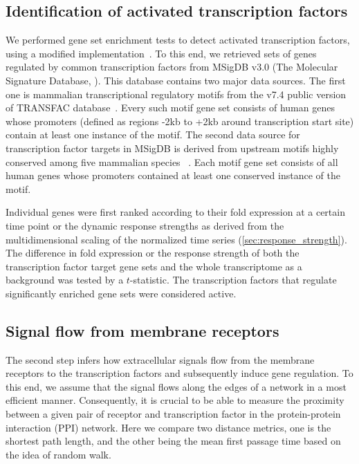 \subsection{Identification of activated transcription factors}
We performed gene set enrichment tests to detect activated
transcription factors, 
using a modified implementation~\citep{Luo2009}.
To this end, we retrieved sets of genes regulated by 
common transcription factors from MSigDB v3.0 (The Molecular Signature Database, \cite{Liberzon2011}). 
This database contains two major data sources. The first one is mammalian 
transcriptional regulatory motifs from the v7.4 public version of TRANSFAC 
database~\citep{Matys2003b}. Every such motif gene set consists of human 
genes whose promoters (defined as regions -2kb to +2kb around transcription 
start site) contain at least one instance of the motif.
The second data source for transcription factor targets in MSigDB is derived 
from upstream motifs highly conserved among five mammalian species~%
\citep{Xie2005e}. Each motif gene set consists of all human genes whose 
promoters contained at least one conserved instance of the motif.

Individual genes were first ranked according to their fold 
expression at a certain time point or the dynamic response 
strengths as derived from the 
multidimensional scaling of the normalized time series 
(\ref{sec:response_strength}). The difference in fold 
expression or the response strength of both
the transcription factor target gene sets and  
the whole transcriptome as a background was tested by a 
$t$-statistic. 
The transcription factors that regulate 
significantly enriched
gene sets were considered active.

\subsection{Signal flow from membrane receptors}
The second step infers how extracellular signals flow from the 
membrane receptors to 
the transcription factors and subsequently induce gene regulation. 
To this end, we assume that the signal flows along the edges of a network 
in a most efficient manner. Consequently, it is 
crucial to be able to measure the proximity between a given pair of receptor and
transcription factor in the protein-protein interaction (PPI) 
network. Here we 
compare two distance metrics, one is the shortest path length, and the other
being the mean first passage time based on the idea of random walk.

